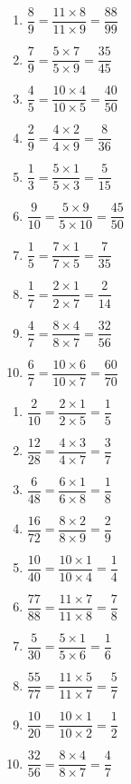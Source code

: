 \documentclass[a4paper,11pt,fleqn]{article}
\begin{document}
\begin{correction}
\exo{}

\begin{multicols}{2}
\begin{enumerate}[itemsep=2em]
	\item $ \dfrac{8}{9} = \dfrac{11 \times 8}{11 \times 9} = \dfrac{88}{99} $
	\item $ \dfrac{7}{9} = \dfrac{5 \times 7}{5 \times 9} = \dfrac{35}{45} $
	\item $ \dfrac{4}{5} = \dfrac{10 \times 4}{10 \times 5} = \dfrac{40}{50} $
	\item $ \dfrac{2}{9} = \dfrac{4 \times 2}{4 \times 9} = \dfrac{8}{36} $
	\item $ \dfrac{1}{3} = \dfrac{5 \times 1}{5 \times 3} = \dfrac{5}{15} $
	\item $ \dfrac{9}{10} = \dfrac{5 \times 9}{5 \times 10} = \dfrac{45}{50} $
	\item $ \dfrac{1}{5} = \dfrac{7 \times 1}{7 \times 5} = \dfrac{7}{35} $
	\item $ \dfrac{1}{7} = \dfrac{2 \times 1}{2 \times 7} = \dfrac{2}{14} $
	\item $ \dfrac{4}{7} = \dfrac{8 \times 4}{8 \times 7} = \dfrac{32}{56} $
	\item $ \dfrac{6}{7} = \dfrac{10 \times 6}{10 \times 7} = \dfrac{60}{70} $
\end{enumerate}
\end{multicols}

\exo{}

\begin{multicols}{2}
\begin{enumerate}[itemsep=2em]
	\item $ \dfrac{2}{10} = \dfrac{2 \times 1}{2 \times 5} = \dfrac{1}{5} $
	\item $ \dfrac{12}{28} = \dfrac{4 \times 3}{4 \times 7} = \dfrac{3}{7} $
	\item $ \dfrac{6}{48} = \dfrac{6 \times 1}{6 \times 8} = \dfrac{1}{8} $
	\item $ \dfrac{16}{72} = \dfrac{8 \times 2}{8 \times 9} = \dfrac{2}{9} $
	\item $ \dfrac{10}{40} = \dfrac{10 \times 1}{10 \times 4} = \dfrac{1}{4} $
	\item $ \dfrac{77}{88} = \dfrac{11 \times 7}{11 \times 8} = \dfrac{7}{8} $
	\item $ \dfrac{5}{30} = \dfrac{5 \times 1}{5 \times 6} = \dfrac{1}{6} $
	\item $ \dfrac{55}{77} = \dfrac{11 \times 5}{11 \times 7} = \dfrac{5}{7} $
	\item $ \dfrac{10}{20} = \dfrac{10 \times 1}{10 \times 2} = \dfrac{1}{2} $
	\item $ \dfrac{32}{56} = \dfrac{8 \times 4}{8 \times 7} = \dfrac{4}{7} $
\end{enumerate}
\end{multicols}


\end{correction}
\end{document}
